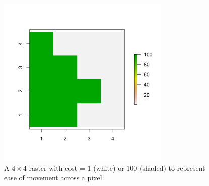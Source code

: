 \documentclass[12pt]{article}
\begin{document}
\newpage


\begin{figure}
\begin{center}
\includegraphics[height=3.25in,width=3.25in]{figs/raster_2values}
\end{center}
\caption{A $4 \times 4$ raster with cost = 1 (white) or 100 (shaded) to represent ease of movement across a pixel.}
\label{ecoldist.fig.raster}
\end{figure}


\newpage
\end{document}
